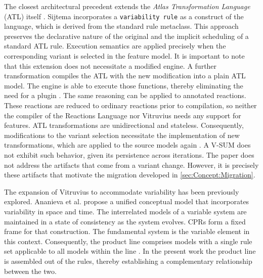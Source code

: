 The closest architectural precedent extends the \textit{Atlas Transformation Language} (ATL) itself \cite{sijtema2010introducing}.
Sijtema incorporates a \texttt{variability rule} as a construct of the language, which is derived from the standard rule metaclass.
This approach preserves the declarative nature of the original and the implicit scheduling of a standard ATL rule.
Execution semantics are applied precisely when the corresponding variant is selected in the feature model.
It is important to note that this extension does not necessitate a modified engine.
A further transformation compiles the ATL with the new modification into a plain ATL model.
The engine is able to execute those functions, thereby eliminating the need for a plugin \cite{sijtema2010introducing}.
The same reasoning can be applied to annotated reactions.
These reactions are reduced to ordinary reactions prior to compilation, so neither the compiler of the Reactions Language nor Vitruvius needs any support for features.
ATL transformations are unidirectional and stateless.
Consequently, modifications to the variant selection necessitate the implementation of new transformations, which are applied to the source models again \cite{sijtema2010introducing}.
A V-SUM does not exhibit such behavior, given its persistence across iterations.
The paper does not address the artifacts that come from a variant change.
However, it is precisely these artifacts that motivate the migration developed in \autoref{sec:Concept:Migration}.

The expansion of Vitruvius to accommodate variability has been previously explored.
Ananieva et al. propose a unified conceptual model that incorporates variability in space and time.
The interrelated models of a variable system are maintained in a state of consistency as the system evolves.
CPRs form a fixed frame for that construction.
The fundamental system is the variable element in this context.
Consequently, the product line comprises models with a single rule set applicable to all models within the line \cite{ananieva2022preserving}.
In the present work the product line is assembled out of the rules, thereby establishing a complementary relationship between the two.

